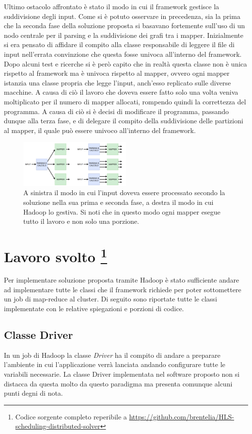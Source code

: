 \documentclass[]{IEEEtran}
\begin{document}
Ultimo ostacolo affrontato è stato il modo in cui il framework gestisce la suddivisione degli input. Come si è potuto osservare in precedenza, sia la prima che la seconda fase della soluzione proposta si basavano fortemente sull'uso di un nodo centrale per il parsing e la suddivisione dei grafi tra i mapper. Inizialmente si era pensato di affidare il compito alla classe responsabile di leggere il file di input nell'errata convinzione che questa fosse univoca all'interno del framework. Dopo alcuni test e ricerche si è però capito che in realtà questa classe non è unica rispetto al framework ma è univoca rispetto al mapper, ovvero ogni mapper istanzia una classe propria che legge l'input, anch'esso replicato sulle diverse macchine. A causa di ciò il lavoro che doveva essere fatto solo una volta veniva moltiplicato per il numero di mapper allocati, rompendo quindi la correttezza del programma. A causa di ciò si è decisi di modificare il programma, passando dunque alla terza fase, e di delegare il compito della suddivisione delle partizioni al mapper, il quale può essere univoco all'interno del framework.
\begin{figure}
	\includegraphics[width=0.5\textwidth]{images/hadoop_input.png}
	\caption{A sinistra il modo in cui l'input doveva essere processato secondo la soluzione nella sua prima e seconda fase, a destra il modo in cui Hadoop lo gestiva. Si noti che in questo modo ogni mapper esegue tutto il lavoro e non solo una porzione.}
\end{figure}

\section[Lavoro]{Lavoro svolto \footnote{Codice sorgente completo reperibile a \url{https://github.com/brentelia/HLS-scheduling-distributed-solver}}} \label{work}
Per implementare soluzione proposta tramite Hadoop è stato sufficiente andare ad implementare tutte le classi che il framework richiede per poter sottomettere un job  di map-reduce al cluster. Di seguito sono riportate tutte le classi implementate con le relative spiegazioni e porzioni di codice.
\subsection{Classe Driver}
In un job di Hadoop la classe \emph{Driver} ha il compito di andare a preparare  l'ambiente in cui l'applicazione verrà lanciata andando configurare tutte le variabili necessarie. La classe Driver implementata nel software proposto non si distacca da questa molto da questo paradigma ma presenta comunque alcuni punti degni di nota.
\end{document}
